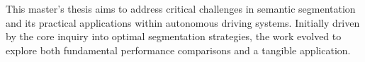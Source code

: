 
This master's thesis aims to address critical challenges in  semantic segmentation and its practical applications within autonomous driving systems. Initially driven by the core inquiry into optimal  segmentation strategies, the work evolved to explore both fundamental performance comparisons and a tangible application.
